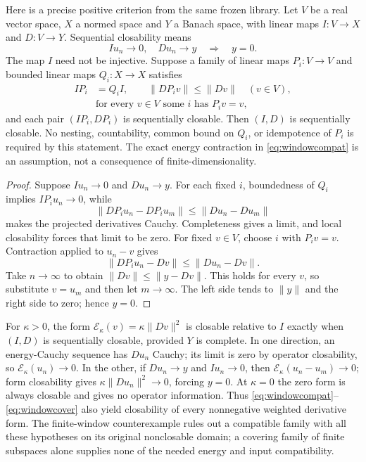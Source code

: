 \documentclass[11pt]{article}
\begin{document}
Here is a precise positive criterion from the same frozen library.
Let $V$ be a real vector space, $X$ a normed space and $Y$ a Banach
space, with linear maps $I:V\to X$ and $D:V\to Y$. Sequential
closability means
\[
 Iu_n\to0,\quad Du_n\to y\quad\Longrightarrow\quad y=0.
\]
The map $I$ need not be injective. Suppose a family of linear
maps $P_i:V\to V$ and bounded linear maps $Q_i:X\to X$ satisfies
\begin{align}
 IP_i&=Q_iI,\qquad \|DP_iv\|\leq\|Dv\|\quad(v\in V),
       \label{eq:windowcompat}\\
 &\text{for every }v\in V\text{ some }i\text{ has }P_iv=v,
       \label{eq:windowcover}
\end{align}
and each pair $(IP_i,DP_i)$ is sequentially closable.
Then $(I,D)$ is sequentially closable. No nesting, countability,
common bound on $Q_i$, or idempotence of $P_i$ is required by this
statement. The exact energy contraction in \eqref{eq:windowcompat}
is an assumption, not a consequence of finite-dimensionality.

\begin{proof}
Suppose $Iu_n\to0$ and $Du_n\to y$. For each fixed $i$,
boundedness of $Q_i$ implies $IP_iu_n\to0$, while
\[
 \|DP_i u_n-DP_i u_m\|\leq\|Du_n-Du_m\|
\]
makes the projected derivatives Cauchy. Completeness gives a
limit, and local closability forces that limit to be zero.
For fixed $v\in V$, choose $i$ with $P_iv=v$. Contraction applied
to $u_n-v$ gives
\[
 \|DP_i u_n-Dv\|\leq\|Du_n-Dv\|.
\]
Take $n\to\infty$ to obtain $\|Dv\|\leq\|y-Dv\|$.
This holds for every $v$, so substitute $v=u_m$ and then let
$m\to\infty$. The left side tends to $\|y\|$ and the right
side to zero; hence $y=0$.
\end{proof}

For $\kappa>0$, the form
$\mathcal E_\kappa(v)=\kappa\|Dv\|^2$ is closable relative to
$I$ exactly when $(I,D)$ is sequentially closable, provided $Y$
is complete. In one direction, an energy-Cauchy sequence has
$Du_n$ Cauchy; its limit is zero by operator closability, so
$\mathcal E_\kappa(u_n)\to0$. In the other, if $Du_n\to y$
and $Iu_n\to0$, then
$\mathcal E_\kappa(u_n-u_m)\to0$; form closability gives
$\kappa\|Du_n\|^2\to0$, forcing $y=0$. At $\kappa=0$ the
zero form is always closable and gives no operator information.
Thus \eqref{eq:windowcompat}--\eqref{eq:windowcover} also yield
closability of every nonnegative weighted derivative form. The
finite-window counterexample rules out a compatible family with all
these hypotheses on its original nonclosable domain; a covering
family of finite subspaces alone supplies none of the needed energy
and input compatibility.
\end{document}
